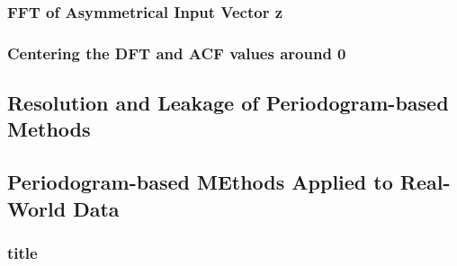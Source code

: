 \documentclass[main.tex]{subfiles}
\begin{document}
\subsubsection{FFT of Asymmetrical Input Vector z}

\subsubsection{Centering the DFT and ACF values around 0}










\subsection{Resolution and Leakage of Periodogram-based Methods}











\subsection{Periodogram-based MEthods Applied to Real-World Data}






\subsubsection{title}


\clearpage
\end{document}
